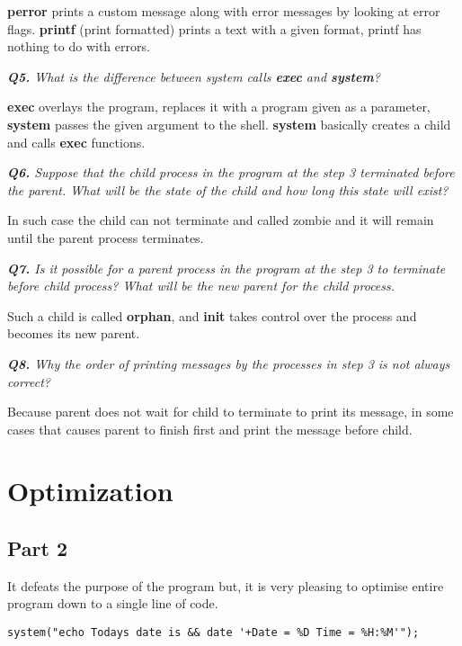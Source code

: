 \documentclass[11pt]{article}
\begin{document}
\textbf{perror} prints a custom message along with error messages by looking at error flags. \textbf{printf} (print formatted) prints a text with a given format, printf has nothing to do with errors.

\vspace{5mm}
\textit{\textbf{Q5.} What is the difference between system calls \textbf{exec} and \textbf{system}?}
\vspace{5mm}

\textbf{exec} overlays the program, replaces it with a program given as a parameter, \textbf{system} passes the given argument to the shell. \textbf{system} basically creates a child and calls \textbf{exec} functions.

\vspace{5mm}
\textit{\textbf{Q6.} Suppose that the child process in the program at the step 3 terminated before the parent. What will be the state of the child and how long this state will exist?}
\vspace{5mm}

In such case the child can not terminate and called zombie and it will remain until the parent process terminates.

\vspace{5mm}
\textit{\textbf{Q7.} Is it possible for a parent process in the program at the step 3 to terminate before child process? What will be the new parent for the child process.}
\vspace{5mm}

Such a child is called \textbf{orphan}, and \textbf{init} takes control over the process and becomes its new parent.

\vspace{5mm}
\textit{\textbf{Q8.} Why the order of printing messages by the processes in step 3 is not always correct?}
\vspace{5mm}

Because parent does not wait for child to terminate to print its message, in some cases that causes parent to finish first and print the message before child.

\section*{Optimization}

\subsection*{Part 2}

It defeats the purpose of the program but, it is very pleasing to optimise entire program down to a single line of code.

\vspace{2mm}
\begin{minipage}{1\textwidth}
\begin{lstlisting}[frame=tlrb]
system("echo Todays date is && date '+Date = %D Time = %H:%M'");
\end{lstlisting}
\end{minipage}
\end{document}
